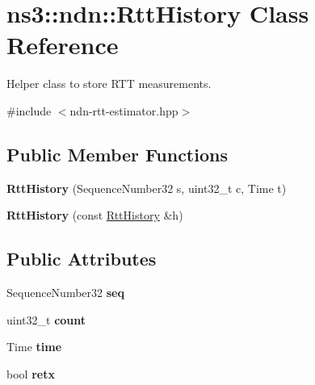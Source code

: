 \hypertarget{classns3_1_1ndn_1_1RttHistory}{}\section{ns3\+:\+:ndn\+:\+:Rtt\+History Class Reference}
\label{classns3_1_1ndn_1_1RttHistory}


Helper class to store R\+TT measurements.  




{\ttfamily \#include $<$ndn-\/rtt-\/estimator.\+hpp$>$}

\subsection*{Public Member Functions}
\begin{DoxyCompactItemize}
\item 
{\bfseries Rtt\+History} (Sequence\+Number32 s, uint32\+\_\+t c, Time t)\hypertarget{classns3_1_1ndn_1_1RttHistory_a99153cb563757fc84f2ff9c51d98f823}{}\label{classns3_1_1ndn_1_1RttHistory_a99153cb563757fc84f2ff9c51d98f823}

\item 
{\bfseries Rtt\+History} (const \hyperlink{classns3_1_1ndn_1_1RttHistory}{Rtt\+History} \&h)\hypertarget{classns3_1_1ndn_1_1RttHistory_a0c9d1e260f25b308647160d3bed8f42e}{}\label{classns3_1_1ndn_1_1RttHistory_a0c9d1e260f25b308647160d3bed8f42e}

\end{DoxyCompactItemize}
\subsection*{Public Attributes}
\begin{DoxyCompactItemize}
\item 
Sequence\+Number32 {\bfseries seq}\hypertarget{classns3_1_1ndn_1_1RttHistory_a60e9b69060081f8be28f72633e96e0f2}{}\label{classns3_1_1ndn_1_1RttHistory_a60e9b69060081f8be28f72633e96e0f2}

\item 
uint32\+\_\+t {\bfseries count}\hypertarget{classns3_1_1ndn_1_1RttHistory_af89b556e3dc052142f0a2854b9b39ded}{}\label{classns3_1_1ndn_1_1RttHistory_af89b556e3dc052142f0a2854b9b39ded}

\item 
Time {\bfseries time}\hypertarget{classns3_1_1ndn_1_1RttHistory_a36e166e11ebe651556e3d50850b36bb7}{}\label{classns3_1_1ndn_1_1RttHistory_a36e166e11ebe651556e3d50850b36bb7}

\item 
bool {\bfseries retx}\hypertarget{classns3_1_1ndn_1_1RttHistory_a522d52295dd4d160b962493d3282a39b}{}\label{classns3_1_1ndn_1_1RttHistory_a522d52295dd4d160b962493d3282a39b}

\end{DoxyCompactItemize}


